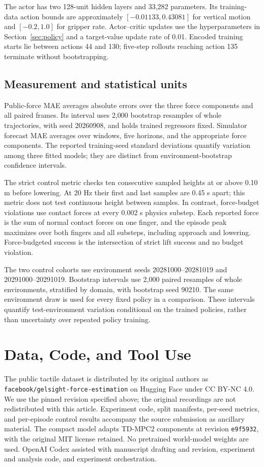 \documentclass[letterpaper,10pt,conference]{ieeeconf}
\begin{document}
The actor has two 128-unit hidden layers and 33,282 parameters. Its
training-data action bounds are approximately $[-0.01133,0.43081]$ for
vertical motion and $[-0.2,1.0]$ for gripper rate. Actor--critic updates
use the hyperparameters in Section~\ref{sec:policy} and a target-value update rate
of 0.01. Encoded training starts lie between actions 44 and 130;
five-step rollouts reaching action 135 terminate without bootstrapping.

\subsection{Measurement and statistical units}
Public-force MAE averages absolute errors over the three force components
and all paired frames. Its interval uses 2,000 bootstrap resamples of whole trajectories,
with seed 20260908, and holds trained regressors fixed. Simulator forecast MAE averages over windows,
five horizons, and the appropriate force components. The reported
training-seed standard deviations quantify variation among three fitted
models; they are distinct from environment-bootstrap confidence intervals.

The strict control metric checks ten consecutive sampled heights at or
above 0.10 m before lowering. At 20 Hz their first and last samples are
0.45 s apart; this metric does not test continuous height between samples.
In contrast, force-budget violations use contact forces at every 0.002 s
physics substep. Each reported force is the sum of normal contact forces
on one finger, and the episode peak maximizes over both fingers and all
substeps, including approach and lowering. Force-budgeted success is the
intersection of strict lift success and no budget violation.

The two control cohorts use environment seeds 20281000--20281019 and
20291000--20291019. Bootstrap intervals use 2,000 paired resamples of
whole environments, stratified by domain, with bootstrap seed 90210.
The same environment draw is used for every fixed policy in a comparison.
These intervals quantify test-environment variation conditional on the
trained policies, rather than uncertainty over repeated policy training.

\section*{Data, Code, and Tool Use}
The public tactile dataset is distributed by its original authors as
\texttt{facebook/gelsight-force-estimation} on Hugging Face under CC BY-NC 4.0.
We use the pinned revision specified above; the original recordings are not
redistributed with this article. Experiment code, split manifests, per-seed
metrics, and per-episode control results accompany the source submission as
ancillary material. The compact model adapts TD-MPC2 components at revision
\texttt{e9f5932}, with the original MIT license retained. No pretrained
world-model weights are used. OpenAI Codex assisted with manuscript drafting
and revision, experiment and analysis code, and experiment orchestration.
\end{document}
